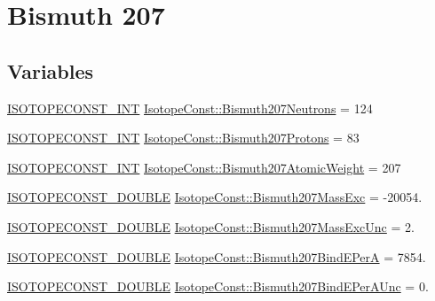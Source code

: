 \hypertarget{group___isotope_const-_bismuth-_bi207}{}\section{Bismuth 207}
\label{group___isotope_const-_bismuth-_bi207}
\subsection*{Variables}
\begin{DoxyCompactItemize}
\item 
\mbox{\hyperlink{group___isotope_const-_macros_ga5f18360b3e99483a35c32d789e62621c}{I\+S\+O\+T\+O\+P\+E\+C\+O\+N\+S\+T\+\_\+\+I\+NT}} \mbox{\hyperlink{group___isotope_const-_bismuth-_bi207_gafd20c176d78c9911e278939add73dc23}{Isotope\+Const\+::\+Bismuth207\+Neutrons}} = 124
\item 
\mbox{\hyperlink{group___isotope_const-_macros_ga5f18360b3e99483a35c32d789e62621c}{I\+S\+O\+T\+O\+P\+E\+C\+O\+N\+S\+T\+\_\+\+I\+NT}} \mbox{\hyperlink{group___isotope_const-_bismuth-_bi207_ga72cf3d87bc584173f7586bf90d2bf021}{Isotope\+Const\+::\+Bismuth207\+Protons}} = 83
\item 
\mbox{\hyperlink{group___isotope_const-_macros_ga5f18360b3e99483a35c32d789e62621c}{I\+S\+O\+T\+O\+P\+E\+C\+O\+N\+S\+T\+\_\+\+I\+NT}} \mbox{\hyperlink{group___isotope_const-_bismuth-_bi207_gac82aaa54d611249828322051eef21c1a}{Isotope\+Const\+::\+Bismuth207\+Atomic\+Weight}} = 207
\item 
\mbox{\hyperlink{group___isotope_const-_macros_ga8f45a7272ce02c0b4c65c44636ed719a}{I\+S\+O\+T\+O\+P\+E\+C\+O\+N\+S\+T\+\_\+\+D\+O\+U\+B\+LE}} \mbox{\hyperlink{group___isotope_const-_bismuth-_bi207_ga6332e04734b6033717883d9f8ae7aea6}{Isotope\+Const\+::\+Bismuth207\+Mass\+Exc}} = -\/20054.
\item 
\mbox{\hyperlink{group___isotope_const-_macros_ga8f45a7272ce02c0b4c65c44636ed719a}{I\+S\+O\+T\+O\+P\+E\+C\+O\+N\+S\+T\+\_\+\+D\+O\+U\+B\+LE}} \mbox{\hyperlink{group___isotope_const-_bismuth-_bi207_gad4676bd106d36f199c94293548f9f494}{Isotope\+Const\+::\+Bismuth207\+Mass\+Exc\+Unc}} = 2.
\item 
\mbox{\hyperlink{group___isotope_const-_macros_ga8f45a7272ce02c0b4c65c44636ed719a}{I\+S\+O\+T\+O\+P\+E\+C\+O\+N\+S\+T\+\_\+\+D\+O\+U\+B\+LE}} \mbox{\hyperlink{group___isotope_const-_bismuth-_bi207_ga86132f65969cb141a949d11aefd9e315}{Isotope\+Const\+::\+Bismuth207\+Bind\+E\+PerA}} = 7854.
\item 
\mbox{\hyperlink{group___isotope_const-_macros_ga8f45a7272ce02c0b4c65c44636ed719a}{I\+S\+O\+T\+O\+P\+E\+C\+O\+N\+S\+T\+\_\+\+D\+O\+U\+B\+LE}} \mbox{\hyperlink{group___isotope_const-_bismuth-_bi207_ga676549061ec5fd2b9d1e8c3798ebc99e}{Isotope\+Const\+::\+Bismuth207\+Bind\+E\+Per\+A\+Unc}} = 0.

\end{DoxyCompactItemize}
